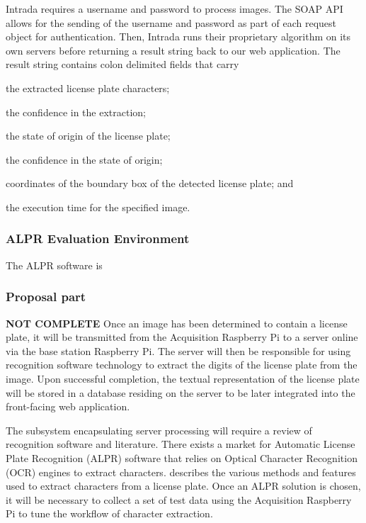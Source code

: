 \documentclass[11pt, oneside, fullpage, doublespace]{article}
\begin{document}
Intrada requires a username and password to process images. The SOAP API allows for the sending of the username and password as part of each request object for authentication. Then, Intrada runs their proprietary algorithm on its own servers before returning a result string back to our web application. The result string contains colon delimited fields that carry 
\begin{inparaenum}
\item the extracted license plate characters;
\item the confidence in the extraction;
\item the state of origin of the license plate;
\item the confidence in the state of origin;
\item coordinates of the boundary box of the detected license plate; and
\item the execution time for the specified image.
\end{inparaenum}

\subsubsection{ALPR Evaluation Environment}
The ALPR software is 



\subsubsection{Proposal part}
{\color{red}\textbf{NOT COMPLETE}}
Once an image has been determined to contain a license plate, it will be transmitted from the Acquisition Raspberry Pi to a server online via the base station Raspberry Pi. The server will then be responsible for using recognition software technology to extract the digits of the license plate from the image. Upon successful completion, the textual representation of the license plate will be stored in a database residing on the server to be later integrated into the front-facing web application.

The subsystem encapsulating server processing will require a review of recognition software and literature. There exists a market for Automatic License Plate Recognition (ALPR) software that relies on Optical Character Recognition (OCR) engines to extract characters. \cite{du2013} describes the various methods and features used to extract characters from a license plate. Once an ALPR solution is chosen, it will be necessary to collect a set of test data using the Acquisition Raspberry Pi to tune the workflow of character extraction.
\end{document}
